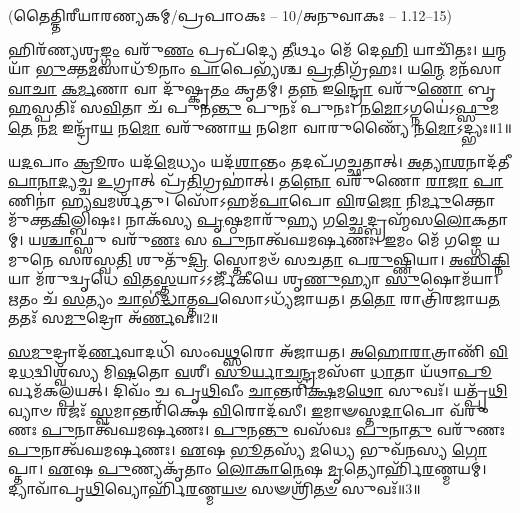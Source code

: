 
\vspace{-1ex}
\centerline{\scriptsize (𑌤𑍈𑌤𑍍𑌤𑌿𑌰𑍀𑌯𑌾𑌰𑌣𑍍𑌯𑌕𑌮𑍍/𑌪𑍍𑌰𑌪𑌾𑌠𑌕𑌃 – 10/𑌅𑌨𑍁𑌵𑌾𑌕𑌃 – 1.12–15)}

𑌹𑌿𑌰᳴𑌣𑍍𑌯𑌶𑍃\-\ul{𑌙𑍍𑌗𑌂} 𑌵𑌰𑍁᳴\-\ul{𑌣𑌂} 𑌪𑍍𑌰𑌪᳴𑌦𑍍𑌯𑍇 \ul{𑌤𑍀}\-𑌰𑍍𑌥𑌂 𑌮𑍇᳴ 𑌦𑍇\-\ul{𑌹𑌿} 𑌯𑌾𑌚𑌿᳴𑌤𑌃। \ul{𑌯}\-𑌨𑍍𑌮𑌯𑌾᳴ \ul{𑌭𑍁}\-𑌕𑍍𑌤\-\ul{𑌮}\-𑌸𑌾𑌧𑍂᳴𑌨𑌾𑌂 \ul{𑌪𑌾}\-𑌪𑍇𑌭𑍍𑌯᳴𑌶𑍍𑌚 \ul{𑌪𑍍𑌰}\-𑌤𑌿𑌗𑍍𑌰᳴𑌹𑌃। 𑌯\-\ul{𑌨𑍍𑌮𑍇} 𑌮𑌨᳴𑌸𑌾 \ul{𑌵𑌾}\-\-\ul{𑌚𑌾} \ul{𑌕}\-\-\ul{𑌰𑍍𑌮}\-𑌣𑌾 𑌵𑌾 𑌦𑍁᳴𑌷𑍍𑌕𑍃\-\ul{𑌤𑌂} 𑌕𑍃𑌤𑌮𑍍। 𑌤\-\ul{𑌨𑍍𑌨} 𑌇\-\ul{𑌨𑍍𑌦𑍍𑌰𑍋} 𑌵𑌰𑍁᳴\-\ul{𑌣𑍋} 𑌬𑍃\-\ul{𑌹}\-𑌸𑍍𑌪𑌤𑌿𑌃᳴ 𑌸\-\ul{𑌵𑌿}\-𑌤𑌾 𑌚᳴ 𑌪𑍁𑌨\-\ul{𑌨𑍍𑌤𑍁} 𑌪𑍁𑌨𑌃᳴ 𑌪𑍁𑌨𑌃। 𑌨\-\ul{𑌮𑍋}\-𑌽𑌗𑍍𑌨𑌯𑍇॑𑌽\-\ul{𑌫𑍍𑌸𑍁}\-𑌮\-\ul{𑌤𑍇} 𑌨\-\ul{𑌮} 𑌇𑌨𑍍𑌦𑍍𑌰𑌾᳴\-\ul{𑌯} 𑌨\-\ul{𑌮𑍋} 𑌵𑌰𑍁᳴𑌣𑌾\-\ul{𑌯} 𑌨𑌮𑍋 𑌵𑌾𑌰𑍁𑌣𑍍𑌯𑍈᳴ 𑌨\-\ul{𑌮𑍋}\-𑌽𑌦𑍍𑌭𑍍𑌯𑌃॥1॥

 𑌯\-\ul{𑌦}\-𑌪𑌾𑌂 \ul{𑌕𑍍𑌰𑍂}\-𑌰𑌂 𑌯𑌦᳴\-\ul{𑌮𑍇}\-𑌧𑍍𑌯𑌂 𑌯𑌦᳴\-\ul{𑌶𑌾}\-𑌨𑍍𑌤𑌂 𑌤𑌦𑌪᳴𑌗𑌚𑍍𑌛𑌤𑌾𑌤𑍍। \ul{𑌅}\-\-\ul{𑌤𑍍𑌯𑌾}\-\-\ul{𑌶}\-𑌨𑌾𑌦᳴𑌤𑍀\-\-\ul{𑌪𑌾}\-\-\ul{𑌨𑌾}\-\-\ul{𑌦𑍍𑌯}\-𑌚𑍍𑌚 \ul{𑌉}\-𑌗𑍍𑌰𑌾𑌤𑍍 𑌪𑍍𑌰᳴\-\ul{𑌤𑌿}\-𑌗𑍍𑌰𑌹𑌾॑𑌤𑍍। 𑌤\-\ul{𑌨𑍍𑌨𑍋} 𑌵𑌰𑍁᳴𑌣𑍋 \ul{𑌰𑌾}\-\-\ul{𑌜𑌾} \ul{𑌪𑌾}\-𑌣𑌿𑌨𑌾॑ 𑌹𑍍𑌯\-\ul{𑌵}\-𑌮𑌰𑍍\mbox{}𑌶᳴𑌤𑍁। 𑌸𑍋᳴𑌽𑌹𑌮᳴\-\ul{𑌪𑌾}\-𑌪𑍋 \ul{𑌵𑌿}\-𑌰\-\ul{𑌜𑍋} 𑌨𑌿\-\ul{𑌰𑍍𑌮𑍁}\-𑌕𑍍𑌤𑍋 𑌮𑍁᳴𑌕𑍍𑌤\-\ul{𑌕𑌿}\-𑌲𑍍𑌬𑌿𑌷𑌃। 𑌨𑌾𑌕᳴𑌸𑍍𑌯 \ul{𑌪𑍃}\-𑌷𑍍𑌠𑌮𑌾𑌰𑍁᳴\-\ul{𑌹𑍍𑌯} 𑌗\-\ul{𑌚𑍍𑌛𑍇}\-𑌦𑍍𑌬𑍍𑌰𑌹𑍍𑌮᳴𑌸\-\ul{𑌲𑍋}\-𑌕𑌤𑌾𑌮𑍍। 𑌯\-\ul{𑌶𑍍𑌚𑌾}\-𑌫𑍍𑌸𑍁 𑌵𑌰𑍁᳴\-\ul{𑌣𑌃} 𑌸 \ul{𑌪𑍁}\-𑌨𑌾𑌤𑍍𑌵᳴𑌘𑌮𑌰𑍍\mbox{}\-\ul{𑌷}\-𑌣𑌃। \ul{𑌇}\-𑌮𑌂 𑌮𑍇᳴ 𑌗𑌙𑍍𑌗𑍇 𑌯𑌮𑍁𑌨𑍇 𑌸𑌰𑌸𑍍𑌵\-\ul{𑌤𑌿} 𑌶𑍁𑌤𑍁᳴\-\ul{𑌦𑍍𑌰𑌿} 𑌸𑍍𑌤𑍋𑌮𑍞᳴ 𑌸𑌚\-\ul{𑌤𑌾} 𑌪\-\ul{𑌰𑍁}\-𑌷𑍍𑌣𑌿𑌯𑌾। \ul{𑌅}\-\-\ul{𑌸𑌿}\-\-\ul{𑌕𑍍𑌨𑌿}\-𑌯𑌾 𑌮᳴𑌰𑍁𑌦𑍍\mbox{}𑌵𑍃𑌧𑍇 \ul{𑌵𑌿}\-𑌤\-\ul{𑌸𑍍𑌤}\-𑌯𑌾𑌽𑌽𑌰𑍍𑌜𑍀᳴𑌕𑍀𑌯𑍇 𑌶𑍃\-\ul{𑌣𑍁}\-𑌹𑍍𑌯𑌾 \ul{𑌸𑍁}\-𑌷𑍋𑌮᳴𑌯𑌾। \ul{𑌋}\-𑌤𑌂 𑌚᳴ \ul{𑌸}\-𑌤𑍍𑌯𑌂 \ul{𑌚𑌾}\-𑌭𑍀॑\-\ul{𑌦𑍍𑌧𑌾}\-𑌤𑍍𑌤\-\ul{𑌪}\-𑌸𑍋𑌽𑌧𑍍𑌯᳴𑌜𑌾𑌯𑌤। 𑌤\-\ul{𑌤𑍋} 𑌰𑌾𑌤𑍍𑌰𑌿᳴𑌰𑌜𑌾𑌯\-\ul{𑌤} 𑌤𑌤𑌃᳴ 𑌸\-\ul{𑌮𑍁}\-𑌦𑍍𑌰𑍋 𑌅᳴\-\ul{𑌰𑍍𑌣}\-𑌵𑌃॥2॥
 
 \ul{𑌸}\-\-\ul{𑌮𑍁}\-𑌦𑍍𑌰𑌾𑌦᳴\-\ul{𑌰𑍍𑌣}\-𑌵𑌾𑌦𑌧𑌿᳴ 𑌸𑌂𑌵\-\ul{𑌥𑍍𑌸}\-𑌰𑍋 𑌅᳴𑌜𑌾𑌯𑌤। \ul{𑌅}\-\-\ul{𑌹𑍋}\-\-\ul{𑌰𑌾}\-𑌤𑍍𑌰𑌾𑌣𑌿᳴ \ul{𑌵𑌿}\-𑌦\-\ul{𑌧}\-𑌦𑍍𑌵𑌿𑌶𑍍𑌵᳴𑌸𑍍𑌯 𑌮𑌿\-\ul{𑌷}\-𑌤𑍋 \ul{𑌵}\-𑌶𑍀। \ul{𑌸𑍂}\-\-\ul{𑌰𑍍𑌯𑌾}\-\-\ul{𑌚}\-\-\ul{𑌨𑍍𑌦𑍍𑌰}\-𑌮𑌸𑍗᳴ \ul{𑌧𑌾}\-𑌤𑌾 𑌯᳴𑌥𑌾\-\ul{𑌪𑍂}\-𑌰𑍍𑌵𑌮᳴𑌕𑌲𑍍𑌪𑌯𑌤𑍍। 𑌦𑌿𑌵𑌂᳴ 𑌚 𑌪𑍃\-\ul{𑌥𑌿}\-𑌵𑍀𑌂 \ul{𑌚𑌾}\-𑌨𑍍𑌤𑌰𑌿᳴\-\ul{𑌕𑍍𑌷}\-𑌮\-\ul{𑌥𑍋} 𑌸𑍁𑌵𑌃᳴। 𑌯𑌤𑍍𑌪𑍃᳴\-\ul{𑌥𑌿}\-𑌵𑍍𑌯𑌾𑍞 𑌰𑌜𑌃᳴ \ul{𑌸𑍍𑌵}\-𑌮𑌾𑌨𑍍𑌤𑌰𑌿᳴𑌕𑍍𑌷𑍇 \ul{𑌵𑌿}\-𑌰𑍋𑌦᳴𑌸𑍀। \ul{𑌇}\-𑌮𑌾𑍟𑌸𑍍𑌤\-\ul{𑌦𑌾}\-𑌪𑍋 𑌵᳴𑌰𑍁𑌣𑌃 \ul{𑌪𑍁}\-𑌨𑌾𑌤𑍍𑌵᳴𑌘𑌮𑌰𑍍\mbox{}\-\ul{𑌷}\-𑌣𑌃। \ul{𑌪𑍁}\-𑌨\-\ul{𑌨𑍍𑌤𑍁} 𑌵𑌸᳴𑌵𑌃 \ul{𑌪𑍁}\-𑌨𑌾\-\ul{𑌤𑍁} 𑌵𑌰𑍁᳴𑌣𑌃 \ul{𑌪𑍁}\-𑌨𑌾𑌤𑍍𑌵᳴𑌘𑌮𑌰𑍍\mbox{}\-\ul{𑌷}\-𑌣𑌃। \ul{𑌏}\-𑌷 \ul{𑌭𑍂}\-𑌤𑌸𑍍𑌯᳴ \ul{𑌮}\-𑌧𑍍𑌯𑍇 𑌭𑍁𑌵᳴𑌨𑌸𑍍𑌯 \ul{𑌗𑍋}\-𑌪𑍍𑌤𑌾। \ul{𑌏}\-𑌷 \ul{𑌪𑍁}\-𑌣𑍍𑌯𑌕𑍃᳴𑌤𑌾𑌂 \ul{𑌲𑍋}\-\-\ul{𑌕𑌾}\-\-\ul{𑌨𑍇}\-𑌷 \ul{𑌮𑍃}\-𑌤𑍍𑌯𑍋𑌰𑍍\mbox{}𑌹𑌿᳴\-\ul{𑌰}\-𑌣𑍍𑌮𑌯𑌮𑍍॑। 𑌦𑍍𑌯𑌾𑌵𑌾᳴𑌪𑍃\-\ul{𑌥𑌿}\-𑌵𑍍𑌯𑍋𑌰𑍍\mbox{}𑌹𑌿᳴\-\ul{𑌰}\-𑌣𑍍𑌮\-\ul{𑌯}\-\-\ul{𑍞} 𑌸𑍟𑌶𑍍𑌰𑌿᳴\-\ul{𑌤}\-\-\ul{𑍞} 𑌸𑍁𑌵𑌃᳴॥3॥

